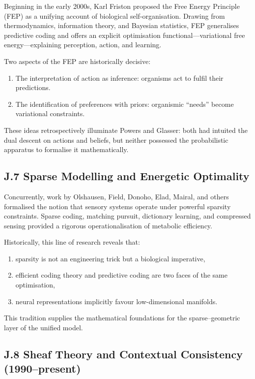 \documentclass[11pt,a4paper,twoside]{article}
\begin{document}
Beginning in the early 2000s, Karl Friston proposed the Free Energy Principle (FEP) as a unifying account of biological self-organisation.
Drawing from thermodynamics, information theory, and Bayesian statistics, FEP generalises predictive coding and offers an explicit optimisation functional---variational free energy---explaining perception, action, and learning.

Two aspects of the FEP are historically decisive:

\begin{enumerate}
\item The interpretation of action as inference: organisms act to fulfil their predictions.
\item The identification of preferences with priors: organismic “needs” become variational constraints.
\end{enumerate}

These ideas retrospectively illuminate Powers and Glasser: both had intuited the dual descent on actions and beliefs, but neither possessed the probabilistic apparatus to formalise it mathematically.

\subsection*{J.7 Sparse Modelling and Energetic Optimality}

Concurrently, work by Olshausen, Field, Donoho, Elad, Mairal, and others formalised the notion that sensory systems operate under powerful sparsity constraints.
Sparse coding, matching pursuit, dictionary learning, and compressed sensing provided a rigorous operationalisation of metabolic efficiency.

Historically, this line of research reveals that:

\begin{enumerate}
\item sparsity is not an engineering trick but a biological imperative,
\item efficient coding theory and predictive coding are two faces of the same optimisation,
\item neural representations implicitly favour low-dimensional manifolds.
\end{enumerate}

This tradition supplies the mathematical foundations for the sparse--geometric layer of the unified model.

\subsection*{J.8 Sheaf Theory and Contextual Consistency (1990--present)}
\end{document}
